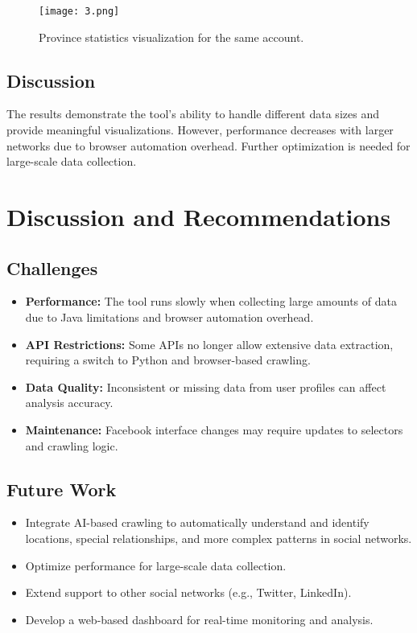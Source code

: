 \documentclass[13pt,a4paper]{report}
\begin{document}
\begin{figure}[h!]
    \centering
    \texttt{[image: 3.png]}
    \caption{Province statistics visualization for the same account.}
\end{figure}

\section{Discussion}
The results demonstrate the tool's ability to handle different data sizes and provide meaningful visualizations. However, performance decreases with larger networks due to browser automation overhead. Further optimization is needed for large-scale data collection.

\chapter{Discussion and Recommendations}
\section{Challenges}
\begin{itemize}
    \item \textbf{Performance:} The tool runs slowly when collecting large amounts of data due to Java limitations and browser automation overhead.
    \item \textbf{API Restrictions:} Some APIs no longer allow extensive data extraction, requiring a switch to Python and browser-based crawling.
    \item \textbf{Data Quality:} Inconsistent or missing data from user profiles can affect analysis accuracy.
    \item \textbf{Maintenance:} Facebook interface changes may require updates to selectors and crawling logic.
\end{itemize}

\section{Future Work}
\begin{itemize}
    \item Integrate AI-based crawling to automatically understand and identify locations, special relationships, and more complex patterns in social networks.
    \item Optimize performance for large-scale data collection.
    \item Extend support to other social networks (e.g., Twitter, LinkedIn).
    \item Develop a web-based dashboard for real-time monitoring and analysis.
\end{itemize}
\end{document}
